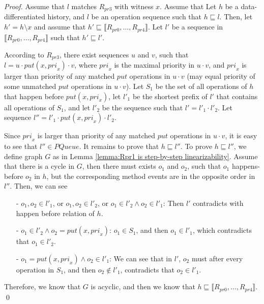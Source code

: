 \begin {proof}

Assume that $l$ matches $R_{\textit{pr3}}$ with witness $x$. Assume that  Let $h$ be a data-differentiated history, and $l$ be an operation sequence such that $h \sqsubseteq l$. Then, let $h'=h \setminus x$ and assume that $h' \sqsubseteq \llbracket R_{\textit{pr0}},\ldots,R_{\textit{pr4}} \rrbracket$. Let $l'$ be a sequence in $\llbracket R_{\textit{pr0}},\ldots,R_{\textit{pr4}} \rrbracket$ such that $h' \sqsubseteq l'$.

According to $R_{\textit{pr3}}$, there exist sequences $u$ and $v$, such that $l=u \cdot \textit{put}(x,\textit{pri}_x) \cdot v$, where $\textit{pri}_x$ is the maximal priority in $u \cdot v$, and $\textit{pri}_x$ is larger than priority of any matched $\textit{put}$ operations in $u \cdot v$ (may equal priority of some unmatched $\textit{put}$ operations in $u \cdot v$). Let $S_1$ be the set of all operations of $h$ that happen before $\textit{put}(x,\textit{pri}_x)$, let $l'_1$ be the shortest prefix of $l'$ that contains all operations of $S_1$, and let $l'_2$ be the sequence such that $l' = l'_1 \cdot l'_2$. Let sequence $l'' = l'_1 \cdot \textit{put}(x,\textit{pri}_x) \cdot l'_2$.

Since $\textit{pri}_x$ is larger than priority of any matched $\textit{put}$ operations in $u \cdot v$, it is easy to see that $l'' \in \textit{PQueue}$. It remains to prove that $h \sqsubseteq l''$. To prove $h \sqsubseteq l''$, we define graph $G$ as in Lemma \ref{lemma:Rpr1 is step-by-step linearizability}. Assume that there is a cycle in $G$, then there must exists $o_1$ and $o_2$, such that $o_1$ happens-before $o_2$ in $h$, but the corresponding method events are in the opposite order in $l''$. Then, we can see

\begin{itemize}
\setlength{\itemsep}{0.5pt}
\item[-] $o_1,o_2 \in l'_1$, or $o_1,o_2 \in l'_2$, or $o_1 \in l'_2 \wedge o_2 \in l'_1$: Then $l'$ contradicts with happen before relation of $h$.

\item[-] $o_1 \in l'_2 \wedge o_2 = \textit{put}(x,\textit{pri}_x)$: $o_1 \in S_1$, and then $o_1 \in l'_1$, which contradicts that $o_1 \in l'_2$.

\item[-] $o_1 = \textit{put}(x,\textit{pri}_x) \wedge o_2 \in l'_1$: We can see that in $l'$, $o_2$ must after every operation in $S_1$, and then $o_2 \notin l'_1$, contradicts that $o_2 \in l'_1$.
\end{itemize}

Therefore, we know that $G$ is acyclic, and then we know that $h \sqsubseteq \llbracket R_{\textit{pr0}},\ldots,R_{\textit{pr4}} \rrbracket$. \qed
\end {proof}


